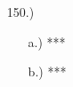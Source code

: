 \documentclass[12pt]{article}
\newcommand{\vertb}[1]{\left\vert#1\right\vert}
\begin{document}
\begin{itemize}
 









    \item [150.)] \begin{itemize}
        \item [a.)] ***
        
        \item [b.)] ***
     \end{itemize}



\end{itemize}
\end{document}
